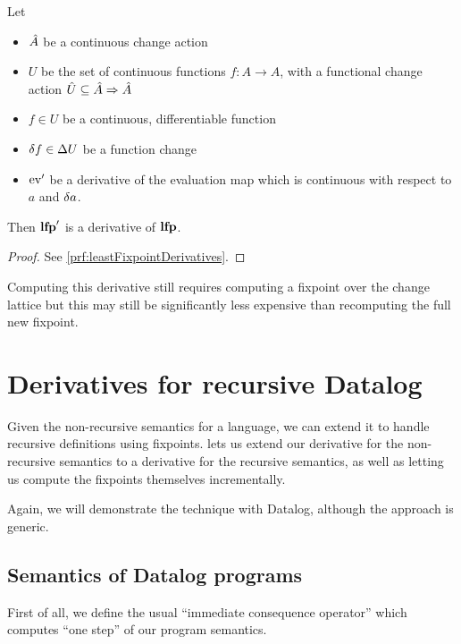 \begin{thm}[name=Derivatives of least fixpoint operators, restate=leastFixpointDerivatives]
  \label{thm:leastFixpointDerivatives}
  Let
  \begin{itemize}
    \item $\hat{A}$ be a continuous change action
    \item $U$ be the set of continuous functions $f : A \rightarrow A$, 
      with a functional change action $\hat{U} \subseteq \hat{A} \Rightarrow \hat{A}$
    \item $f \in U$ be a continuous, differentiable function
    \item $\delta f \in \Delta U$ be a function change
    \item $\operatorname{ev}'$ be a derivative of the evaluation map which is continuous with
      respect to $a$ and $\delta a$.
  \end{itemize}
  Then $\mathbf{lfp}'$ is a derivative of $\mathbf{lfp}$.
\end{thm}
\ifproofs
\begin{proof}
  See \cref{prf:leastFixpointDerivatives}.
\end{proof}
\fi

Computing this derivative still requires computing a fixpoint \textemdash{} over the change
lattice \textemdash{} but this may still be significantly less expensive than
recomputing the full new fixpoint.

\section{Derivatives for recursive Datalog}
\label{sec:recursiveDatalog}

Given the non-recursive semantics for a language, we can extend it to handle
recursive definitions using fixpoints.  lets us extend our
derivative for the non-recursive semantics to a derivative for the recursive
semantics, as well as letting us compute the fixpoints themselves
incrementally. 

Again, we will demonstrate the technique with Datalog, although the approach is generic.

\subsection{Semantics of Datalog programs}

First of all, we define the usual ``immediate consequence operator'' which
computes ``one step'' of our program semantics.

